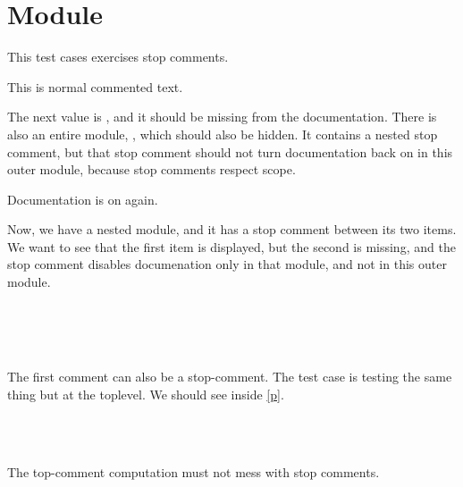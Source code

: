 \section{Module }\label{module-Stop}%
This test cases exercises stop comments.

\label{module-Stop-val-foo}\begin{ocamlindent}This is normal commented text.\end{ocamlindent}%
\medbreak
The next value is , and it should be missing from the documentation. There is also an entire module, , which should also be hidden. It contains a nested stop comment, but that stop comment should not turn documentation back on in this outer module, because stop comments respect scope.

Documentation is on again.

Now, we have a nested module, and it has a stop comment between its two items. We want to see that the first item is displayed, but the second is missing, and the stop comment disables documenation only in that module, and not in this outer module.

\label{module-Stop-module-N}\begin{ocamlindent}\label{module-Stop-module-N-val-quux}\\
\end{ocamlindent}%
\\
\label{module-Stop-val-lol}\\
The first comment can also be a stop-comment. The test case  is testing the same thing but at the toplevel. We should see  inside \hyperref[module-Stop-module-O]{[p\pageref*{module-Stop-module-O}]}.

\label{module-Stop-module-O}\begin{ocamlindent}\label{module-Stop-module-O-val-bar}\\
\end{ocamlindent}%
\\
The top-comment computation must not mess with stop comments.

